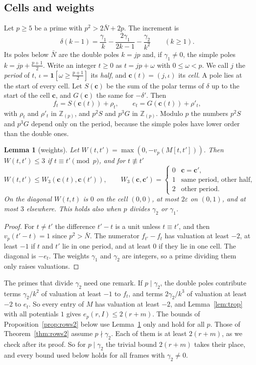\documentclass[11pt]{amsart}
\newtheorem{lemma}[theorem]{Lemma}
\theoremstyle{definition}
\theoremstyle{remark}
\numberwithin{equation}{section}
\newcommand{\Z}{\mathbb Z}
\begin{document}
\subsection{Cells and weights}
Let $p\ge5$ be a prime with $p^2>2\bar N+2p$. The increment is
\[
 \delta(k-1)=\frac{\gamma_1}k-\frac{2\gamma_1}{2k-1}-\frac{\gamma_2}{k^2}\qquad(k\ge1).
\]
Its poles below $\bar N$ are the double poles $k=jp$ and, if $\gamma_1\ne0$, the simple poles $k=jp+\frac{p+1}2$. Write
an integer $t\ge0$ as $t=jp+\omega$ with $0\le\omega<p$. We call $j$ the \emph{period} of $t$, $\iota=\mathbf 1[\omega\ge\frac{p+1}2]$
its \emph{half}, and $\mathbf c(t)=(j,\iota)$ its \emph{cell}. A pole lies at the start of every cell. Let
$S(\mathbf c)$ be the sum of the polar terms of $\delta$ up to the start of the cell $\mathbf c$, and
$G(\mathbf c)$ the same for $-\delta'$. Then
\[
 f_t=S(\mathbf c(t))+\rho_t,\qquad e_t=G(\mathbf c(t))+\rho'_t ,
\]
with $\rho_t$ and $\rho'_t$ in $\Z_{(p)}$, and $p^2S$ and $p^3G$ in $\Z_{(p)}$. Modulo $p$ the
numbers $p^2S$ and $p^3G$ depend only on the period, because the simple poles have lower order than the
double ones.

\begin{lemma}[weights]\label{lem:weights2}
Let $W(t,t')=\max(0,-v_p(M[t,t']))$. Then $W(t,t')\le3$ if $t\equiv t'\pmod p$, and for $t\not\equiv t'$
\[
 W(t,t')\le W_3(\mathbf c(t),\mathbf c(t')),\qquad W_3(\mathbf c,\mathbf c')=\begin{cases}0&\mathbf c=\mathbf c',\\
 1&\text{same period, other half},\\ 2&\text{other period.}\end{cases}
\]
On the diagonal $W(t,t)$ is $0$ on the cell $(0,0)$, at most $2\varepsilon$ on $(0,1)$, and at most $3$ elsewhere. This holds
also when $p$ divides $\gamma_2$ or $\gamma_1$.
\end{lemma}
\begin{proof}
For $t\ne t'$ the difference $t'-t$ is a unit unless $t\equiv t'$, and then $v_p(t'-t)=1$ since $p^2>\bar N$. The
numerator $f_{t'}-f_t$ has valuation at least $-2$, at least $-1$ if $t$ and $t'$ lie in one period, and at least $0$ if
they lie in one cell. The diagonal is $-e_t$. The weights $\gamma_1$ and $\gamma_2$ are integers, so a prime dividing
them only raises valuations.
\end{proof}

The primes that divide $\gamma_2$ need one remark. If $p\mid\gamma_2$, the double poles contribute terms
$\gamma_2/k^2$ of valuation at least $-1$ to $f_t$, and terms $2\gamma_2/k^3$ of valuation at least $-2$ to $e_t$. So
every entry of $M$ has valuation at least $-2$, and Lemma~\ref{lem:trop} with all potentials $1$ gives
$e_p(r,I)\le2(r+m)$. The bounds of Proposition~\ref{prop:rows2} below use Lemma~\ref{lem:weights2} only and hold for all
$p$. Those of Theorem~\ref{thm:rows2} assume $p\nmid\gamma_2$. Each of them is at least $2(r+m)$, as we check after its
proof. So for $p\mid\gamma_2$ the trivial bound $2(r+m)$ takes their place, and every bound used below holds for all
frames with $\gamma_2\ne0$.
\end{document}
